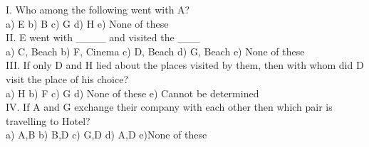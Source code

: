 \documentclass[
]{article}
\begin{document}
I. Who among the following went with A?\\
a) E \hspace{2mm}b) B \hspace{2mm}c) G \hspace{2mm}d) H \hspace{2mm}e) None of these\\

II. E went with \_\_\_\_ and visited the \_\_\_\\
a) C, Beach \hspace{2mm}b) F, Cinema \hspace{2mm}c) D, Beach \hspace{2mm}d) G, Beach \hspace{2mm}e) None of these\\

III. If only D and H lied about the places visited by them, then with whom did D visit the place
of his choice?\\
a) H \hspace{2mm}b) F \hspace{2mm}c) G \hspace{2mm}d) None of these \hspace{2mm}e) Cannot be determined\\

IV. If A and G exchange their company with each other then which pair is travelling to Hotel?\\
a) A,B \hspace{2mm}b) B,D \hspace{2mm}c) G,D \hspace{2mm}d) A,D \hspace{2mm}e)None of these\\
\end{document}
